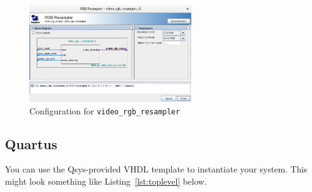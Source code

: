 \documentclass{capstonedoc}
\begin{document}
\begin{figure}[ht]
  \centering
  \includegraphics[width=7cm]{qsys_video_rgb_resampler}
  \caption{Configuration for \texttt{video\_rgb\_resampler}}
  \label{fig:qsysrgbcfg}
\end{figure}

\subsection{Quartus}

You can use the Qsys-provided VHDL template to instantiate your system. This
might look something like Listing~\ref{lst:toplevel} below.
\end{document}

